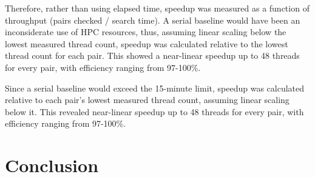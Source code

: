 \documentclass[11pt,a4paper]{article}
\begin{document}
Therefore, rather than using elapsed time, speedup was measured as a function of throughput (pairs checked / search time). A serial baseline would have been an inconsiderate use of HPC resources, thus, assuming linear scaling below the lowest measured thread count, speedup was calculated relative to the lowest thread count for each pair. This showed a near-linear speedup up to 48 threads for every pair, with efficiency ranging from 97-100\%.

Since a serial baseline would exceed the 15-minute limit, speedup was calculated relative to each pair's lowest measured thread count, assuming linear scaling below it. This revealed near-linear speedup up to 48 threads for every pair, with efficiency ranging from 97-100\%.

\section{Conclusion}

\appendix
\end{document}
